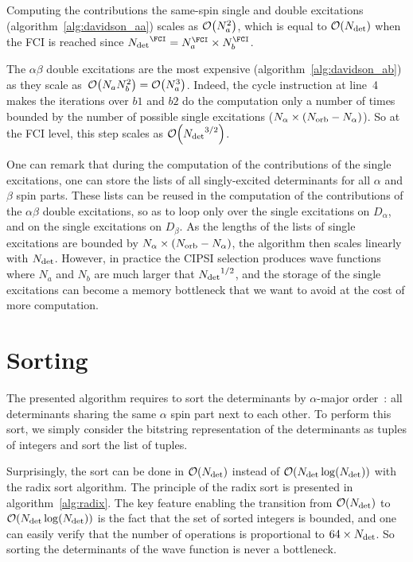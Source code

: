 \documentclass[./thesis.tex]{subfiles}
\begin{document}
Computing the contributions the same-spin single and double excitations
(algorithm~\ref{alg:davidson_aa}) scales as $\order{N_a^2}$, which is equal to
$\order{\Ndet}$ when the FCI is reached since $\Ndet^{\FCI} = N_a^{\FCI} \times
N_b^{\FCI}$.

The $\alpha \beta$ double excitations are the most expensive (algorithm~\ref{alg:davidson_ab})
as they scale as~$\order{N_a  N_b^2} = \order{N_a^3}$. Indeed, the cycle instruction at line~4 makes the
iterations over $b1$ and $b2$ do the computation only a number of times bounded by the number of 
possible single excitations (${N_\alpha} \times \qty({N_\text{orb}} - {N_\alpha})$). So at the FCI level, this step scales as
$\order{\Ndet^{3/2}}$.

One can remark that during the computation of the contributions of the single
excitations, one can store the lists of all singly-excited determinants
for all $\alpha$ and $\beta$ spin parts.
These lists can be reused in the computation of the contributions of the $\alpha \beta$
double excitations, so as to loop only over the single excitations on
$D_\alpha$, and on the single excitations on $D_\beta$. As the lengths of the
lists of single excitations are bounded by ${N_\alpha} \times \qty({N_\text{orb}} - {N_\alpha})$, the
algorithm then scales linearly with ${N_\text{det}}$.  However, in practice the CIPSI
selection produces wave functions where $N_a$ and $N_b$ are much larger
that ${N_\text{det}}^{1/2}$, and the storage of the single excitations can become a
memory bottleneck that we want to avoid at the cost of more computation.

\section{Sorting}

The presented algorithm requires to sort the determinants by $\alpha$-major order~: all determinants
sharing the same $\alpha$ spin part next to each other. To perform this sort, we simply consider the
bitstring representation of the determinants as tuples of integers and sort the list of tuples.

Surprisingly, the sort can be done in $\order{\Ndet}$ instead of $\order{\Ndet \log(\Ndet)}$ with the
radix sort algorithm.\cite{Davis1992Dec}
The principle of the radix sort is presented in algorithm~\ref{alg:radix}.  The
key feature enabling the transition from $\order{\Ndet}$ to $\order{\Ndet
\log(\Ndet)}$ is the fact that the set of sorted integers is bounded, and one
can easily verify that the number of operations is proportional to $64\times
{N_\text{det}}$. So sorting the determinants of the wave function is never a bottleneck.
\end{document}
